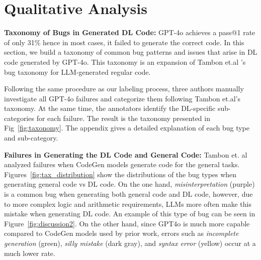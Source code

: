 \section{Qualitative Analysis}




\textbf{Taxonomy of Bugs in Generated DL Code:} GPT-4o achieves a pass@1 rate of only 31\% hence in most cases, it failed to generate the correct code. In this section, we build a taxonomy of common bug patterns and issues that arise in DL code generated by GPT-4o. This taxonomy is an expansion of Tambon et.al \cite{tambon2024bugs}'s bug taxonomy for LLM-generated regular code.

Following the same procedure as our labeling process, three authors manually investigate all GPT-4o failures and categorize them following Tambon et.al's taxonomy. At the same time, the annotators identify the DL-specific sub-categories for each failure. The result is the taxonomy presented in Fig~\ref{fig:taxonomy}. The appendix gives a detailed explanation of each bug type and sub-category.



\textbf{Failures in Generating the DL Code and General Code:} Tambon et. al\cite{tambon2024bugs} analyzed failures when CodeGen models generate code for the general tasks. Figures~\ref{fig:tax_distribution} show the distributions of the bug types when generating general code vs DL code. 
On the one hand, \textit{misinterpretation} (purple) is a common bug when generating both general code and DL code, however, due to more complex logic and arithmetic requirements, LLMs more often make this mistake when generating DL code. An example of this type of bug can be seen in Figure~\ref{fig:discussion2}. On the other hand, since GPT4o is much more capable compared to CodeGen models used by prior work, errors such as \textit{incomplete generation} (green), \textit{silly mistake} (dark gray), and \textit{syntax error} (yellow) occur at a much lower rate.

